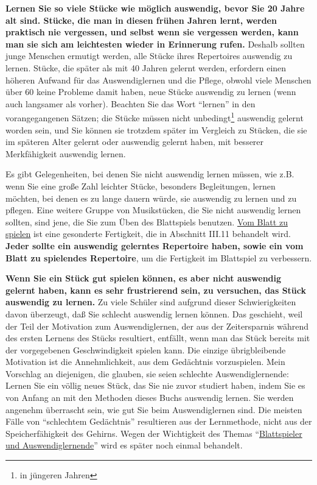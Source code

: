 \textbf{Lernen Sie so viele Stücke wie möglich auswendig, bevor Sie 20 Jahre alt sind.
Stücke, die man in diesen frühen Jahren lernt, werden praktisch nie vergessen, und selbst wenn sie vergessen werden, kann man sie sich am leichtesten wieder in Erinnerung rufen.}
Deshalb sollten junge Menschen ermutigt werden, alle Stücke ihres Repertoires auswendig zu lernen.
Stücke, die später als mit 40 Jahren gelernt werden, erfordern einen höheren Aufwand für das Auswendiglernen und die Pflege, obwohl viele Menschen über 60 keine Probleme damit haben, neue Stücke auswendig zu lernen (wenn auch langsamer als vorher).
Beachten Sie das Wort \enquote{lernen} in den vorangegangenen Sätzen; die Stücke müssen nicht unbedingt\footnote{in jüngeren Jahren} auswendig gelernt worden sein, und Sie können sie trotzdem später im Vergleich zu Stücken, die sie im späteren Alter gelernt oder auswendig gelernt haben, mit besserer Merkfähigkeit auswendig lernen.

Es gibt Gelegenheiten, bei denen Sie nicht auswendig lernen müssen, wie z.B. wenn Sie eine große Zahl leichter Stücke, besonders Begleitungen, lernen möchten, bei denen es zu lange dauern würde, sie auswendig zu lernen und zu pflegen.
Eine weitere Gruppe von Musikstücken, die Sie nicht auswendig lernen sollten, sind jene, die Sie zum Üben des Blattspiels benutzen.
\hyperref[c1iii11]{Vom Blatt zu spielen} ist eine gesonderte Fertigkeit, die in Abschnitt III.11 behandelt wird.
\textbf{Jeder sollte ein auswendig gelerntes Repertoire haben, sowie ein vom Blatt zu spielendes Repertoire}, um die Fertigkeit im Blattspiel zu verbessern.

\textbf{Wenn Sie ein Stück gut spielen können, es aber nicht auswendig gelernt haben, kann es sehr frustrierend sein, zu versuchen, das Stück auswendig zu lernen.}
Zu viele Schüler sind aufgrund dieser Schwierigkeiten davon überzeugt, daß Sie schlecht auswendig lernen können.
Das geschieht, weil der Teil der Motivation zum Auswendiglernen, der aus der Zeitersparnis während des ersten Lernens des Stücks resultiert, entfällt, wenn man das Stück bereits mit der vorgegebenen Geschwindigkeit spielen kann.
Die einzige übrigbleibende Motivation ist die Annehmlichkeit, aus dem Gedächtnis vorzuspielen.
Mein Vorschlag an diejenigen, die glauben, sie seien schlechte Auswendiglernende: Lernen Sie ein völlig neues Stück, das Sie nie zuvor studiert haben, indem Sie es von Anfang an mit den Methoden dieses Buchs auswendig lernen.
Sie werden angenehm überrascht sein, wie gut Sie beim Auswendiglernen sind.
Die meisten Fälle von \enquote{schlechtem Gedächtnis} resultieren aus der Lernmethode, nicht aus der Speicherfähigkeit des Gehirns.
Wegen der Wichtigkeit des Themas \enquote{\hyperref[c1iii6l]{Blattspieler und Auswendiglernende}} wird es später noch einmal behandelt.
 


